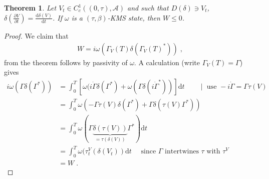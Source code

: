 \documentclass[
a4paper, %
11pt, %
onecolumn, %
openany, %
]{memoir}
\theoremstyle{definition}
\theoremstyle{remark}
\theoremstyle{plain}
\newtheorem{theorem}{Theorem}[chapter]
\begin{document}
\begin{theorem}
Let $V_t\in C_c^1((0,\tau),\mathcal{A})$ and such that $D(\delta)\ni V_t$, $\delta\left(\frac{\partial V}{\partial t}\right)=\frac{\mathrm{d}\delta(V)}{\mathrm{d}t}$. If $\omega$ is a $(\tau,\beta)$-KMS state, then $W\leq 0$.\end{theorem} \begin{proof}
We claim that \begin{align}
W=i\omega(\Gamma_V(T)\delta(\Gamma_V(T)^*))\; ,
\end{align}
from the theorem follows by passivity of $\omega$. A calculation (write $\Gamma_V(T)=\Gamma$) gives \begin{align}
i\omega(\Gamma\delta(\Gamma^*))&=\int_0^T[\omega(i\dot{\Gamma}\delta(\Gamma^*)+\omega(\Gamma\delta(i\dot{\Gamma}^*))]\mathrm{d}t \qquad \mid \text{ use } -i\dot{\Gamma}=\Gamma\tau(V)\\
&=\int_0^T \omega(-\Gamma\tau(V)\delta(\Gamma^*)+\Gamma\delta(\tau(V)\Gamma^*))\\
&= \int_0^T\omega(\Gamma\underbrace{\delta(\tau(V))}_{=\tau(\delta(V))}\Gamma^*)\mathrm{d}t\\
&=\int_0^T\omega(\tau_t^V(\delta(V_t))\mathrm{d}t\quad \text{ since } \Gamma \text{ intertwines } \tau \text{ with } \tau^V\\
&=W\;.
\end{align}
\end{proof}
\end{document}
